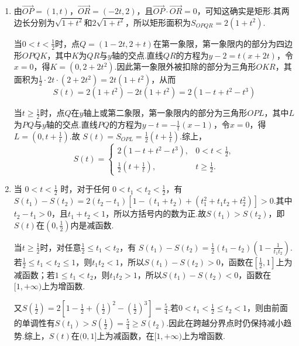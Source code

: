 \documentclass[UTF8,a4paper,oneside,11pt]{ctexbook}
\begin{document}
\begin{solution}
\begin{enumerate}
\item 由\(\overrightarrow{OP}=(1,t)\)，\(\overrightarrow{OR}=(-2t,2)\)，且\(\overrightarrow{OP}\cdot\overrightarrow{OR}=0\)，可知这确实是矩形.其两边长分别为\(\sqrt{1+t^2}\)和\(2\sqrt{1+t^2}\)，所以矩形面积为\(S_{OPQR}=2(1+t^2)\).

当\(0<t<\frac12\)时，点\(Q=(1-2t,2+t)\)在第一象限，第一象限内的部分为四边形\(OPQK\)，其中\(K\)为\(QR\)与\(y\)轴的交点.直线\(QR\)的方程为\(y-2=t(x+2t)\)，令\(x=0\)，得\(K=(0,2+2t^2)\).因此第一象限外被扣除的部分为三角形\(OKR\)，其面积为\(\frac12\cdot2t\cdot(2+2t^2)=2t(1+t^2)\)，从而
\[
S(t)=2(1+t^2)-2t(1+t^2)=2(1-t+t^2-t^3)
\]

当\(t\geqslant\frac12\)时，点\(Q\)在\(y\)轴上或第二象限，第一象限内的部分为三角形\(OPL\)，其中\(L\)为\(PQ\)与\(y\)轴的交点.直线\(PQ\)的方程为\(y-t=-\frac1t(x-1)\)，令\(x=0\)，得\(L=\left(0,t+\frac1t\right)\).故
\(S(t)=S_{OPL}=\frac12\left(t+\frac1t\right)\).综上，
\[
S(t)=
\begin{cases}
2(1-t+t^2-t^3),&0<t<\frac12,\\
\frac12\left(t+\frac1t\right),&t\geqslant\frac12.
\end{cases}
\]

\item 当 \(0 < t < \frac{1}{2}\) 时，对于任何 \(0 < t_1 < t_2 < \frac{1}{2}\)，有
\(S(t_1)-S(t_2)=2(t_2-t_1)\left[1-(t_1+t_2)+(t_1^2+t_1t_2+t_2^2)\right]>0\).其中\(t_2-t_1>0\)，且\(t_1+t_2<1\)，所以方括号内的数为正.故\(S(t_1)>S(t_2)\)，即\(S(t)\)在\(\left(0,\frac12\right)\)内是减函数.

当\(t\geqslant\frac12\)时，对任意\(\frac12\leqslant t_1<t_2\)，有
\(S(t_1)-S(t_2)=\frac12(t_1-t_2)\left(1-\frac{1}{t_1t_2}\right)\).若\(\frac12\leqslant t_1<t_2\leqslant1\)，则\(t_1t_2<1\)，所以\(S(t_1)-S(t_2)>0\)，函数在\(\left[\frac12,1\right]\)上为减函数；若\(1\leqslant t_1<t_2\)，则\(t_1t_2>1\)，所以\(S(t_1)-S(t_2)<0\)，函数在\([1,+\infty)\)上为增函数.

又\(S\left(\frac12\right)=2\left[1-\frac12+\left(\frac12\right)^2-\left(\frac12\right)^3\right]=\frac54\).若\(0<t_1<\frac12\leqslant t_2<1\)，则由前面的单调性有\(S(t_1)>S\left(\frac12\right)=\frac54\geqslant S(t_2)\).因此在跨越分界点时仍保持减小趋势.综上，\(S(t)\)在\((0,1]\)上为减函数，在\([1,+\infty)\)上为增函数.
\end{enumerate}
\end{solution}
\end{document}
